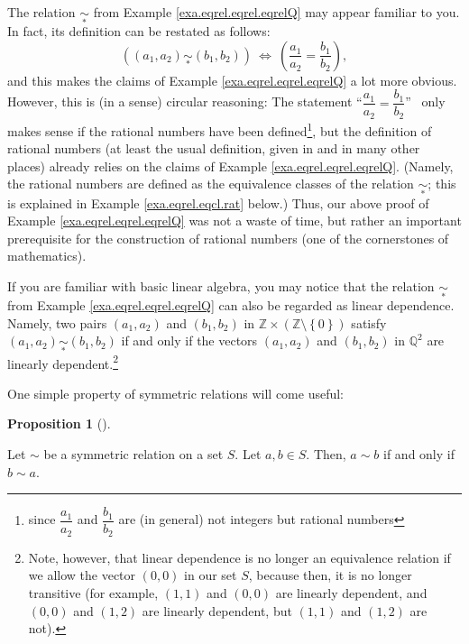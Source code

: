 \documentclass[numbers=enddot,12pt,final,onecolumn,notitlepage]{scrartcl}%
\numberwithin{exer}{subsection}
\theoremstyle{definition}
\newtheorem{prop}[theo]{Proposition}
\newenvironment{proposition}[1][]
{\begin{prop}[#1]\begin{leftbar}}
{\end{leftbar}\end{prop}}
\begin{document}
The relation $\underset{\ast}{\sim}$ from Example \ref{exa.eqrel.eqrel.eqrelQ}
may appear familiar to you. In fact, its definition can be restated as
follows:%
\[
\left(  \left(  a_{1},a_{2}\right)  \underset{\ast}{\sim}\left(  b_{1}%
,b_{2}\right)  \right)  \ \Longleftrightarrow\ \left(  \dfrac{a_{1}}{a_{2}%
}=\dfrac{b_{1}}{b_{2}}\right)  ,
\]
and this makes the claims of Example \ref{exa.eqrel.eqrel.eqrelQ} a lot more
obvious. However, this is (in a sense) circular reasoning: The statement
\textquotedblleft$\dfrac{a_{1}}{a_{2}}=\dfrac{b_{1}}{b_{2}}$\textquotedblright%
\ only makes sense if the rational numbers have been defined\footnote{since
$\dfrac{a_{1}}{a_{2}}$ and $\dfrac{b_{1}}{b_{2}}$ are (in general) not
integers but rational numbers}, but the definition of rational numbers (at
least the usual definition, given in \cite[\S 3.6]{Swanso18} and in many other
places) already relies on the claims of Example \ref{exa.eqrel.eqrel.eqrelQ}.
(Namely, the rational numbers are defined as the equivalence classes of the
relation $\underset{\ast}{\sim}$; this is explained in Example
\ref{exa.eqrel.eqcl.rat} below.) Thus, our above proof of Example
\ref{exa.eqrel.eqrel.eqrelQ} was not a waste of time, but rather an important
prerequisite for the construction of rational numbers (one of the cornerstones
of mathematics).

If you are familiar with basic linear algebra, you may notice that the
relation $\underset{\ast}{\sim}$ from Example \ref{exa.eqrel.eqrel.eqrelQ} can
also be regarded as linear dependence. Namely, two pairs $\left(  a_{1}%
,a_{2}\right)  $ and $\left(  b_{1},b_{2}\right)  $ in $\mathbb{Z}%
\times\left(  \mathbb{Z}\setminus\left\{  0\right\}  \right)  $ satisfy
$\left(  a_{1},a_{2}\right)  \underset{\ast}{\sim}\left(  b_{1},b_{2}\right)
$ if and only if the vectors $\left(  a_{1},a_{2}\right)  $ and $\left(
b_{1},b_{2}\right)  $ in $\mathbb{Q}^{2}$ are linearly
dependent.\footnote{Note, however, that linear dependence is no longer an
equivalence relation if we allow the vector $\left(  0,0\right)  $ in our set
$S$, because then, it is no longer transitive (for example, $\left(
1,1\right)  $ and $\left(  0,0\right)  $ are linearly dependent, and $\left(
0,0\right)  $ and $\left(  1,2\right)  $ are linearly dependent, but $\left(
1,1\right)  $ and $\left(  1,2\right)  $ are not).}

One simple property of symmetric relations will come useful:

\begin{proposition}
\label{prop.eqrel.rel.symm-ba}Let $\sim$ be a symmetric relation on a set $S$.
Let $a,b\in S$. Then, $a\sim b$ if and only if $b\sim a$.
\end{proposition}
\end{document}
